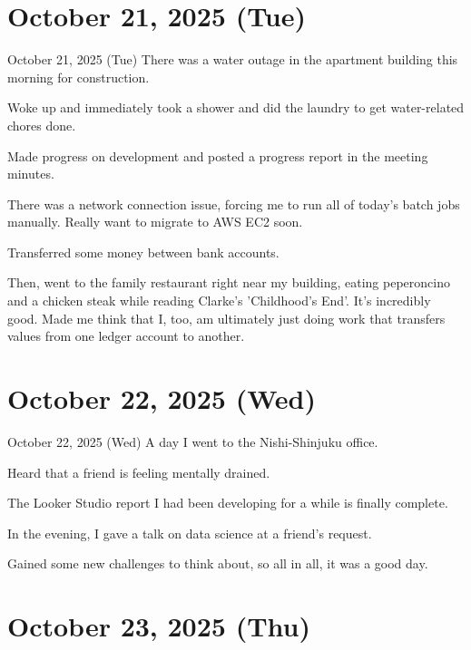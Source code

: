 \documentclass[dvipdfmx, autodetect-engine, aspectratio=169, 10.5pt]{beamer}
\begin{document}
\section{October 21, 2025 (Tue)}

\begin{frame}{October 21, 2025 (Tue)}
There was a water outage in the apartment building this morning for construction.

Woke up and immediately took a shower and did the laundry to get water-related chores done.

Made progress on development and posted a progress report in the meeting minutes.

There was a network connection issue, forcing me to run all of today's batch jobs manually.
Really want to migrate to AWS EC2 soon.

Transferred some money between bank accounts.

Then, went to the family restaurant right near my building, eating peperoncino and a chicken steak while reading Clarke's 'Childhood's End'.
It's incredibly good.
Made me think that I, too, am ultimately just doing work that transfers values from one ledger account to another.
\end{frame}

\section{October 22, 2025 (Wed)}

\begin{frame}{October 22, 2025 (Wed)}
A day I went to the Nishi-Shinjuku office.

Heard that a friend is feeling mentally drained.

The Looker Studio report I had been developing for a while is finally complete.

In the evening, I gave a talk on data science at a friend's request.

Gained some new challenges to think about, so all in all, it was a good day.
\end{frame}

\section{October 23, 2025 (Thu)}
\end{document}
